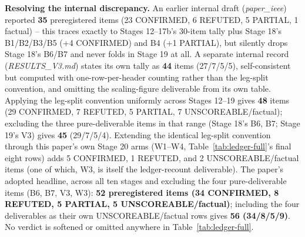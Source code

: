 \documentclass[pdflatex,sn-mathphys-ay]{sn-jnl}
\theoremstyle{thmstyleone}
\theoremstyle{thmstyletwo}
\begin{document}
\begin{appendices}
\textbf{Resolving the internal discrepancy.} An earlier internal draft (\emph{paper\_ieee}) reported \textbf{35} preregistered items (23 CONFIRMED, 6 REFUTED, 5 PARTIAL, 1 factual) -- this traces exactly to Stages 12--17b's 30-item tally plus Stage 18's B1/B2/B3/B5 (+4 CONFIRMED) and B4 (+1 PARTIAL), but silently drops Stage 18's B6/B7 and never folds in Stage 19 at all. A separate internal record (\emph{RESULTS\_V3.md}) states its own tally as \textbf{44} items (27/7/5/5), self-consistent but computed with one-row-per-header counting rather than the leg-split convention, and omitting the scaling-figure deliverable from its own table. Applying the leg-split convention uniformly across Stages 12--19 gives \textbf{48} items (29 CONFIRMED, 7 REFUTED, 5 PARTIAL, 7 UNSCOREABLE/factual); excluding the three pure-deliverable items in that range (Stage 18's B6, B7; Stage 19's V3) gives \textbf{45} (29/7/5/4). Extending the identical leg-split convention through this paper's own Stage 20 arms (W1--W4, Table~\ref{tab:ledger-full}'s final eight rows) adds 5 CONFIRMED, 1 REFUTED, and 2 UNSCOREABLE/factual items (one of which, W3, is itself the ledger-recount deliverable). The paper's adopted headline, across all ten stages and excluding the four pure-deliverable items (B6, B7, V3, W3): \textbf{52 preregistered items (34 CONFIRMED, 8 REFUTED, 5 PARTIAL, 5 UNSCOREABLE/factual)}; including the four deliverables as their own UNSCOREABLE/factual rows gives \textbf{56 (34/8/5/9)}. No verdict is softened or omitted anywhere in Table~\ref{tab:ledger-full}.


\end{appendices}
\end{document}
